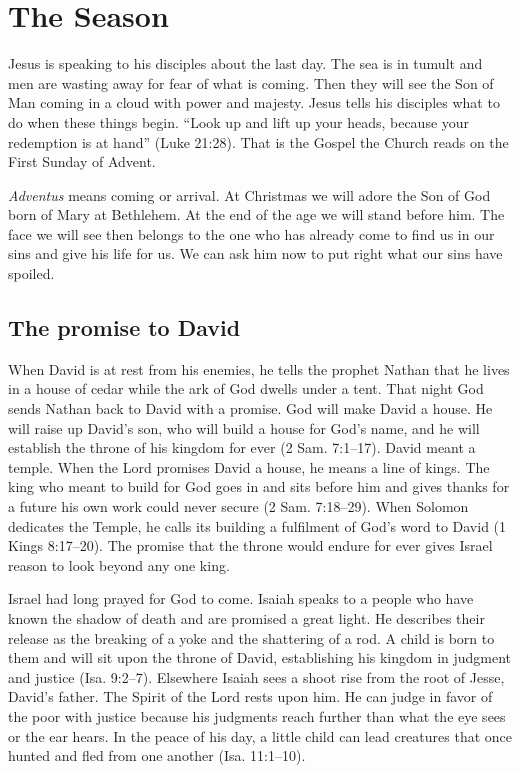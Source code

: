 \section{The Season}

Jesus is speaking to his disciples about the last day. The sea is in tumult
and men are wasting away for fear of what is coming. Then they will see the
Son of Man coming in a cloud with power and majesty. Jesus tells his disciples
what to do when these things begin. “Look up and lift up your heads, because
your redemption is at hand” (Luke 21:28). That is the Gospel the Church reads
on the First Sunday of Advent.

\emph{Adventus} means coming or arrival. At Christmas we will adore the Son of
God born of Mary at Bethlehem. At the end of the age we will stand before him.
The face we will see then belongs to the one who has already come to find us
in our sins and give his life for us. We can ask him now to put right what our
sins have spoiled.

\subsection{The promise to David}

When David is at rest from his enemies, he tells the prophet Nathan that he
lives in a house of cedar while the ark of God dwells under a tent. That
night God sends Nathan back to David with a promise. God will make David a
house. He will raise up David's son, who will build a house for God's name,
and he will establish the throne of his kingdom for ever (2 Sam. 7:1--17).
David meant a temple. When the Lord promises David a house, he means a line
of kings.
The king who meant to build for God goes in and sits before him and gives
thanks for a future his own work could never secure (2 Sam. 7:18--29).
When Solomon dedicates the Temple, he calls its building a fulfilment of
God's word to David (1 Kings 8:17--20). The promise that the throne would
endure for ever gives Israel reason to look beyond any one king.

Israel had long prayed for God to come. Isaiah speaks to a people who have
known the shadow of death and are promised a great light. He describes their
release as the breaking of a yoke and the shattering of a rod. A child is
born to them and will sit upon the throne of David, establishing his kingdom
in judgment and justice (Isa. 9:2--7). Elsewhere Isaiah sees a shoot rise from
the root of Jesse, David's father. The Spirit of the Lord rests upon him. He
can judge in favor of the poor with justice because his judgments reach
further than what the eye sees or the ear hears. In the peace of his day, a
little child can lead creatures that once hunted and fled from one another
(Isa. 11:1--10).

